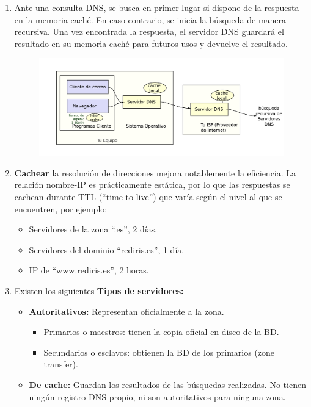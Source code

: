 \begin{enumerate}
    \item Ante una consulta DNS, se busca en primer lugar si dispone de la respuesta en la memoria caché. En caso contrario, se inicia la búsqueda de manera recursiva. Una vez encontrada la respuesta, el servidor DNS guardará el resultado en su memoria caché para futuros usos y devuelve el resultado.
    \begin{figure}[H]\centering\includegraphics[width=\textwidth]{img/DNS_Busqueda.png}\end{figure}
    \item \textbf{Cachear} la resolución de direcciones mejora notablemente la eficiencia. La relación nombre-IP es prácticamente estática, por lo que las respuestas se cachean durante TTL (“time-to-live”) que varía según el nivel al que se encuentren, por ejemplo:
    \begin{itemize}
        \item Servidores de la zona \enquote{.es}, 2 días.
        \item Servidores del dominio \enquote{rediris.es}, 1 día.
        \item IP de \enquote{www.rediris.es}, 2 horas.
    \end{itemize}
    \item Existen los siguientes \textbf{Tipos de servidores:}
    \begin{itemize}
        \item \textbf{Autoritativos: }Representan oficialmente a la zona.
        \begin{itemize}
            \item Primarios o maestros: tienen la copia oficial en disco de la BD.
            \item Secundarios o esclavos: obtienen la BD de los primarios (zone transfer).
        \end{itemize}
        \item \textbf{De cache: }Guardan los resultados de las búsquedas realizadas. No tienen ningún registro DNS propio, ni son autoritativos para ninguna zona.

\end{itemize}
\end{enumerate}
